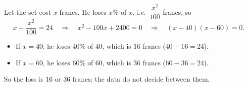 Let the set cost $x$ francs. He loses $x\%$ of $x$, i.e.\ $\dfrac{x^2}{100}$ francs, so
\[
x-\dfrac{x^2}{100}=24\quad\Longrightarrow\quad x^2-100x+2400=0\quad\Longrightarrow\quad (x-40)(x-60)=0 .
\]
\begin{itemize}
\item If $x=40$, he loses $40\%$ of $40$, which is $16$ francs ($40-16=24$).
\item If $x=60$, he loses $60\%$ of $60$, which is $36$ francs ($60-36=24$).
\end{itemize}
So the loss is $\boxed{16\text{ or }36\text{ francs}}$; the data do not decide between them.
